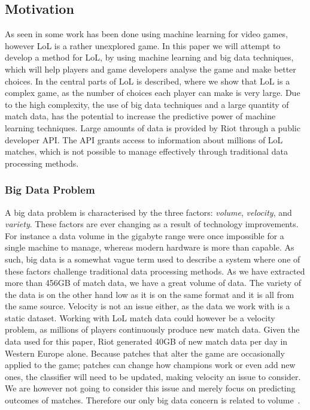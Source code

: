 \subsection{Motivation}\label{sec:motivation}
As seen in  some work has been done using machine learning for video games, however LoL is a rather unexplored game. 
In this paper we will attempt to develop a method for LoL, by using machine learning and big data techniques, which will help players and game developers analyse the game and make better choices. In  the central parts of LoL is described, where we show that LoL is a complex game, as the number of choices each player can make is very large. Due to the high complexity, the use of big data techniques and a large quantity of match data, has the potential to increase the predictive power of machine learning techniques. Large amounts of data is provided by Riot through a public developer API. The API grants access to information about millions of LoL matches, which is not possible to manage effectively through traditional data processing methods.

\subsubsection{Big Data Problem}\label{sec:big_data_problem}
A big data problem is characterised by the three factors: \emph{volume}, \emph{velocity}, and \emph{variety}. These factors are ever changing as a result of technology improvements. For instance a data volume in the gigabyte range were once impossible for a single machine to manage, whereas modern hardware is more than capable. As such, big data is a somewhat vague term used to describe a system where one of these factors challenge traditional data processing methods. As we have extracted more than 456GB of match data, we have a great volume of data. The variety of the data is on the other hand low as it is on the same format and it is all from the same source. Velocity is not an issue either, as the data we work with is a static dataset. Working with LoL match data could however be a velocity problem, as millions of players continuously produce new match data. Given the data used for this paper, Riot generated 40GB of new match data per day in Western Europe alone. Because patches that alter the game are occasionally applied to the game; patches can change how champions work or even add new ones, the classifier will need to be updated, making velocity an issue to consider. We are however not going to consider this issue and merely focus on predicting outcomes of matches. Therefore our only big data concern is related to volume~\cite{madden2012databases}.

